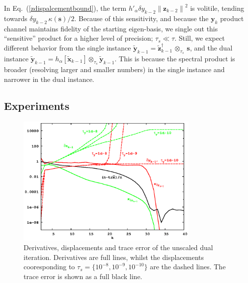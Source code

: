 \documentclass[letterpaper,twocolumn,amsmath,amsfont,amssymb,english,aps,jcp,preprintnumbers,groupaddress,nofootinbib,tightenlines,floatfix]{revtex4}
\newcommand{\mat}[1]{\boldsymbol{#1}}
\newcommand{\ots}{ {\scriptstyle \otimes}_{ \! \tau_s } }
\theoremstyle{plain}
\theoremstyle{remark}
\theoremstyle{plain}
\begin{document}
In Eq.~(\ref{zdispalcementbound}),  the term $h'_\alpha  \delta y_{k-2} { \lVert \mat{z}_{k-2} \rVert }^2$ is volitile, tending towards
$\delta y_{k-2} \, \kappa(\mat{s})/2$.  Because of this sensitivity, and because the $\mat{y}_k$ product channel maintains fidelity 
of the starting eigen-basis, we single out this ``sensitive'' product for a higher level of precision; $\tau_s \ll \tau$.
Still, we expect different behavior from the single instance $\widetilde{\mat{y}}_{k-1} = \widetilde{\mat{z}}^{\dagger}_{k-1} \, \ots \, \mat{s}$,
and the dual instance $\widetilde{\mat{y}}_{k-1} =  h_\alpha [\widetilde{\mat{x}}_{k-1}]  \ots \widetilde{\mat{y}}_{k-1} $.
This is because the spectral product is broader (resolving larger and smaller numbers) 
in the single instance and narrower in the dual instance.

\subsection{Experiments}

\begin{figure}[h]
\includegraphics[width=3.5in]{fig_33_tube_cond_10_noscaling/33_nanotube_cond10_noscale_dual.eps}
\caption{Derivatives, displacements and trace error of the unscaled dual iteration.
Derivatives are full lines, whilst the displacements cooresponding to $\tau_s=\{10^{-8}, 10^{-9}, 10^{-10}\}$
are the dashed lines.  The trace error is shown as a full black line. } \label{flow_noscale_dual}
\end{figure}
\end{document}
